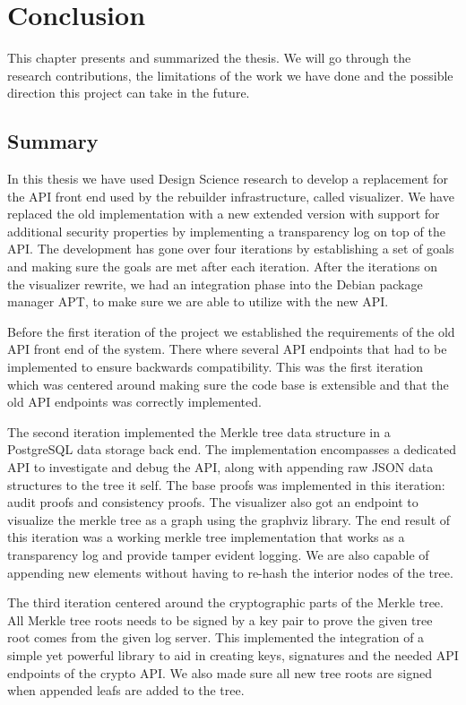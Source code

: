 \documentclass[../Main/thesis.tex]{subfiles}
\begin{document}
\chapter{Conclusion}%
\label{ch:conclusion}
This chapter presents and summarized the thesis. We will go through the research
contributions, the limitations of the work we have done and the possible
direction this project can take in the future.

\section{Summary}%
\label{sec:summary}
In this thesis we have used Design Science research to develop a replacement for
the API front end used by the rebuilder infrastructure, called visualizer. We
have replaced the old implementation with a new extended version with support
for additional security properties by implementing a transparency log on top of
the API. The development has gone over four iterations by establishing a set of
goals and making sure the goals are met after each iteration. After the
iterations on the visualizer rewrite, we had an integration phase into the
Debian package manager APT, to make sure we are able to utilize with the new
API.

Before the first iteration of the project we established the requirements of the
old API front end of the system. There where several API endpoints that had to be
implemented to ensure backwards compatibility. This was the first iteration
which was centered around making sure the code base is extensible and that the
old API endpoints was correctly implemented.

The second iteration implemented the Merkle tree data structure in a PostgreSQL
data storage back end. The implementation encompasses a dedicated API to
investigate and debug the API, along with appending raw JSON data structures to
the tree it self. The base proofs was implemented in this iteration: audit
proofs and consistency proofs. The visualizer also got an endpoint to visualize
the merkle tree as a graph using the graphviz library. The end result of this
iteration was a working merkle tree implementation that works as a transparency
log and provide tamper evident logging. We are also capable of appending new
elements without having to re-hash the interior nodes of the tree.

The third iteration centered around the cryptographic parts of the Merkle tree.
All Merkle tree roots needs to be signed by a key pair to prove the given tree
root comes from the given log server. This implemented the integration of a
simple yet powerful library to aid in creating keys, signatures and the needed
API endpoints of the crypto API. We also made sure all new tree roots are signed
when appended leafs are added to the tree.
\end{document}

